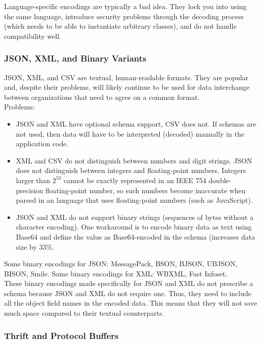 \documentclass[12pt, titlepage]{article}
\begin{document}
Language-specific encodings are typically a bad idea. They lock you into using the same language, introduce security problems through the decoding process (which needs to be able to instantiate arbitrary classes), and do not handle compatibility well.

\subsubsection{JSON, XML, and Binary Variants}

JSON, XML, and CSV are textual, human-readable formats. They are popular and, despite their problems, will likely continue to be used for data interchange between organizations that need to agree on a common format. \\

Problems:
\begin{itemize}
    \item JSON and XML have optional schema support, CSV does not. If schemas are not used, then data will have to be interpreted (decoded) manually in the application code.
    \item XML and CSV do not distinguish between numbers and digit strings. JSON does not distinguish between integers and floating-point numbers. Integers larger than $2^{53}$ cannot be exactly represented in an IEEE 754 double-precision floating-point number, so such numbers become inaccurate when parsed in an language that uses floating-point numbers (such as JavaScript).
    \item JSON and XML do not support binary strings (sequences of bytes without a character encoding). One workaround is to encode binary data as text using Base64 and define the value as Base64-encoded in the schema (increases data size by 33\%.
\end{itemize}

Some binary encodings for JSON: MessagePack, BSON, BJSON, UBJSON, BISON, Smile. Some binary encodings for XML: WBXML, Fast Infoset. \\

These binary encodings made specifically for JSON and XML do not prescribe a schema because JSON and XML do not require one. Thus, they need to include all the object field names in the encoded data. This means that they will not save much space compared to their textual counterparts. \\

\subsubsection{Thrift and Protocol Buffers}
\end{document}
